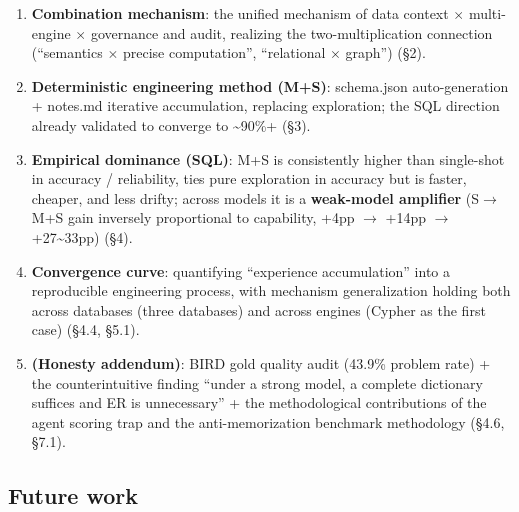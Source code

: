 \documentclass[11pt]{article}
\begin{document}
\begin{enumerate}
\def\labelenumi{\arabic{enumi}.}
\item
  \textbf{Combination mechanism}: the unified mechanism of data context $\times$ multi-engine $\times$ governance and audit, realizing the two-multiplication connection (``semantics $\times$ precise computation'', ``relational $\times$ graph'') (\S{}2).
\item
  \textbf{Deterministic engineering method (M+S)}: schema.json auto-generation + notes.md iterative accumulation, replacing exploration; the SQL direction already validated to converge to \textasciitilde90\%+ (\S{}3).
\item
  \textbf{Empirical dominance (SQL)}: M+S is consistently higher than single-shot in accuracy / reliability, ties pure exploration in accuracy but is faster, cheaper, and less drifty; across models it is a \textbf{weak-model amplifier} (S$\rightarrow$M+S gain inversely proportional to capability, +4pp $\rightarrow$ +14pp $\rightarrow$ +27\textasciitilde33pp) (\S{}4).
\item
  \textbf{Convergence curve}: quantifying ``experience accumulation'' into a reproducible engineering process, with mechanism generalization holding both across databases (three databases) and across engines (Cypher as the first case) (\S{}4.4, \S{}5.1).
\item
  \textbf{(Honesty addendum)}: BIRD gold quality audit (43.9\% problem rate) + the counterintuitive finding ``under a strong model, a complete dictionary suffices and ER is unnecessary'' + the methodological contributions of the agent scoring trap and the anti-memorization benchmark methodology (\S{}4.6, \S{}7.1).
\end{enumerate}

\subsection{Future work}
\end{document}
